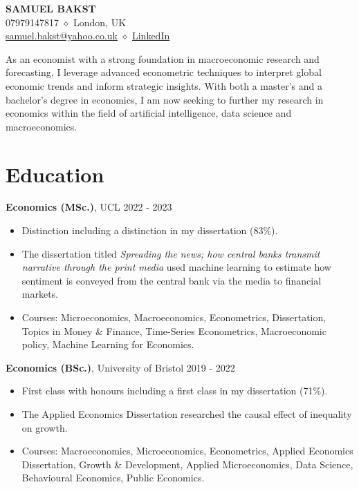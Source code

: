 \documentclass[11pt,a4paper]{article}
\begin{document}
\begin{center}
    {\Huge\textbf{SAMUEL BAKST}} \\[0.3cm]
    07979147817 $\diamond$ London, UK \\
    \href{mailto:samuel.bakst@yahoo.co.uk}{samuel.bakst@yahoo.co.uk} $\diamond$ \href{https://linkedin.com/in/samuel-bakst}{LinkedIn}
\end{center}

\vspace{0.5cm}

As an economist with a strong foundation in macroeconomic research and forecasting, I leverage advanced econometric techniques to interpret global economic trends and inform strategic insights. With both a master's and a bachelor's degree in economics, I am now seeking to further my research in economics within the field of artificial intelligence, data science and macroeconomics.

\section{Education}

\textbf{Economics (MSc.)}, UCL \hfill 2022 - 2023
\begin{itemize}[leftmargin=1.5em]
    \item Distinction including a distinction in my dissertation (83\%).
    \item The dissertation titled \textit{Spreading the news; how central banks transmit narrative through the print media} used machine learning to estimate how sentiment is conveyed from the central bank via the media to financial markets.
    \item Courses: Microeconomics, Macroeconomics, Econometrics, Dissertation, Topics in Money \& Finance, Time-Series Econometrics, Macroeconomic policy, Machine Learning for Economics.
\end{itemize}

\textbf{Economics (BSc.)}, University of Bristol \hfill 2019 - 2022
\begin{itemize}[leftmargin=1.5em]
    \item First class with honours including a first class in my dissertation (71\%).
    \item The Applied Economics Dissertation researched the causal effect of inequality on growth.
    \item Courses: Macroeconomics, Microeconomics, Econometrics, Applied Economics Dissertation, Growth \& Development, Applied Microeconomics, Data Science, Behavioural Economics, Public Economics.
\end{itemize}
\end{document}
